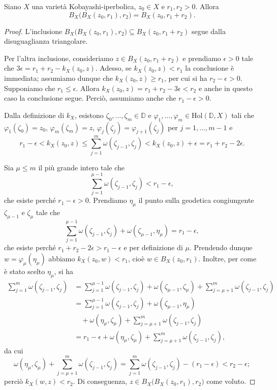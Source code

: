 \begin{lm} \label{ballball}
    Siano $X$ una varietà Kobayashi-iperbolica, $z_0 \in X$ e $r_1,r_2>0$. Allora
    $$B_X\big(B_X(z_0,r_1),r_2\big)=B_X(z_0,r_1+r_2).$$
    \vspace*{-\baselineskip}
\end{lm}

\begin{proof}
    L'inclusione $B_X\big(B_X(z_0,r_1),r_2\big)\subseteq B_X(z_0,r_1+r_2)$ segue dalla disuguaglianza triangolare.

    Per l'altra inclusione, consideriamo $z \in B_X(z_0,r_1+r_2)$ e prendiamo $\epsilon>0$ tale che $3\epsilon=r_1+r_2-k_X(z_0,z)$. Adesso, se $k_X(z_0,z)<r_1$ la conclusione è immediata; assumiamo dunque che $k_X(z_0,z)\ge r_1$, per cui si ha $r_2-\epsilon>0$. Supponiamo che $r_1 \le \epsilon$. Allora $k_X(z_0,z)=r_1+r_2-3\epsilon<r_2$ e anche in questo caso la conclusione segue. Perciò, assumiamo anche che $r_1-\epsilon>0$.

    Dalla definizione di $k_X$, esistono $\zeta_0,\dots,\zeta_m \in \mathbb{D}$ e $\varphi_1,\dots,\varphi_m \in \text{Hol}(\mathbb{D},X)$ tali che $\varphi_1(\zeta_0)=z_0$, $\varphi_m(\zeta_m)=z$, $\varphi_j(\zeta_j)=\varphi_{j+1}(\zeta_j)$ per $j=1,\dots,m-1$ e
    $$r_1-\epsilon<k_X(z_0,z) \le \sum_{j=1}^m \omega(\zeta_{j-1},\zeta_j)<k_X(z_0,z)+\epsilon=r_1+r_2-2\epsilon.$$

    Sia $\mu \le m$ il più grande intero tale che
    $$\sum_{j=1}^{\mu-1} \omega(\zeta_{j-1},\zeta_j)<r_1-\epsilon,$$
    che esiste perché $r_1-\epsilon>0$. Prendiamo $\eta_{\mu}$ il punto sulla geodetica congiungente $\zeta_{\mu-1}$ e $\zeta_{\mu}$ tale che
    $$\sum_{j=1}^{\mu-1} \omega(\zeta_{j-1},\zeta_j)+\omega(\zeta_{\mu-1},\eta_{\mu})=r_1-\epsilon,$$
    che esiste perché $r_1+r_2-2\epsilon>r_1-\epsilon$ e per definizione di $\mu$. Prendendo dunque $w=\varphi_{\mu}(\eta_{\mu})$ abbiamo $k_X(z_0,w)<r_1$, cioè $w\in B_X(z_0,r_1)$. Inoltre, per come è stato scelto $\eta_{\mu}$, si ha
    \begin{align*}
        \sum_{j=1}^m \omega(\zeta_{j-1},\zeta_j)&=\sum_{j=1}^{\mu-1} \omega(\zeta_{j-1},\zeta_j)+\omega(\zeta_{\mu-1},\zeta_{\mu})+\sum_{j=\mu+1}^m \omega(\zeta_{j-1},\zeta_j)\\
        &=\sum_{j=1}^{\mu-1} \omega(\zeta_{j-1},\zeta_j)+\omega(\zeta_{\mu-1},\eta_{\mu})\\
        &\quad+\omega(\eta_{\mu},\zeta_{\mu})+\sum_{j=\mu+1}^m \omega(\zeta_{j-1},\zeta_j)\\
        &=r_1-\epsilon+\omega(\eta_{\mu},\zeta_{\mu})+\sum_{j=\mu+1}^m \omega(\zeta_{j-1},\zeta_j),
    \end{align*}
    da cui
    $$\omega(\eta_{\mu},\zeta_{\mu})+\sum_{j=\mu+1}^m \omega(\zeta_{j-1},\zeta_j)=\sum_{j=1}^m \omega(\zeta_{j-1},\zeta_j)-(r_1-\epsilon)<r_2-\epsilon;$$
    perciò $k_X(w,z)<r_2$. Di conseguenza, $z \in B_X\big(B_X(z_0,r_1),r_2\big)$ come voluto.
\end{proof}

